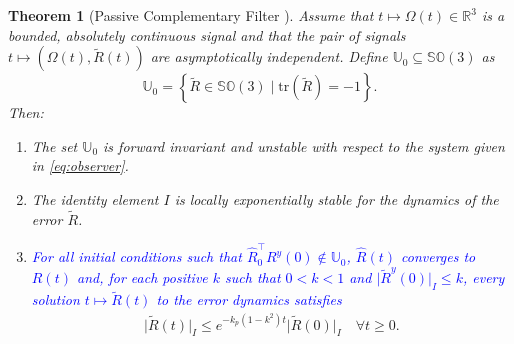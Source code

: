 \documentclass{article}
\newcommand{\SOthree}{\mathbb{SO}(3)}
\newcommand{\R}[1]{\mathbb{R}^{#1}}
\newtheorem{theorem}{Theorem}
\newcommand{\textblue}[1]{\textcolor{blue}{#1}}
\newcommand{\Rtilde}{\tilde{R}}
\newcommand{\normSOthree}[1]{{{\vert}#1 {\vert}_I}}
\newcommand{\expo}[1]{e^{#1}}
\begin{document}
\begin{theorem}[Passive Complementary Filter \textblue{{\cite[Theorem 4.2]{mahony_complementaryFilter}}}]
Assume that $t\mapsto \Omega(t)\in \R{3}$ is a bounded, absolutely continuous signal and that the pair of signals {$t\mapsto (\Omega(t), \Rtilde(t))$ are asymptotically independent}. Define $\mathbb{U}_0 \subseteq \SOthree$ as 
\[\mathbb{U}_0 = \left\{ \Rtilde\in \SOthree \mid \text{tr}(\Rtilde) = -1\right\}.\]
Then:
\begin{enumerate}[label=(\alph*)]
    \item The set $\mathbb{U}_0$ is forward invariant and {unstable} with respect to the system given in \eqref{eq:observer}. \label{item:thm_mahony_bullet1}
    \item {The identity element $I$ is locally exponentially stable for the dynamics of the error $\Rtilde$.}\label{item:thm_mahony_bullet2}
    \item \textblue{For all initial conditions such that ${\hat{R}_0^\top R^y(0) \notin \mathbb{U}_0}$, $\hat{R}(t)$ converges to $R(t)$ and, for each positive $k$ such that $0 < k < 1$ and $\normSOthree{\Rtilde^y(0)} \leq k$, every solution $t\mapsto\Rtilde(t)$ to the error dynamics satisfies \label{item:thm_mahony_bullet3}}
    \begin{align}\label{eq:localExponentialStability}
        \normSOthree{\Rtilde(t)} \leq \expo{-k_p(1-k^2)t}\normSOthree{\Rtilde(0)} \quad \forall t \geq 0.
    \end{align}
\end{enumerate}
\end{theorem}
\end{document}
